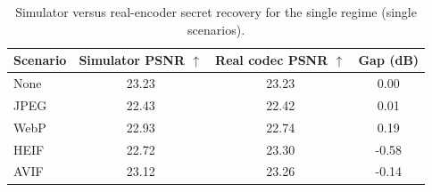 \begin{table}[t]
\centering
\caption{Simulator versus real-encoder secret recovery for the single regime (single scenarios).}
\label{tab:single-single-gap}
\begin{tabular}{lccc}
\toprule
Scenario & Simulator PSNR $\uparrow$ & Real codec PSNR $\uparrow$ & Gap (dB) \\
\midrule
None & 23.23 & 23.23 & 0.00 \\
JPEG & 22.43 & 22.42 & 0.01 \\
WebP & 22.93 & 22.74 & 0.19 \\
HEIF & 22.72 & 23.30 & -0.58 \\
AVIF & 23.12 & 23.26 & -0.14 \\
\bottomrule
\end{tabular}
\end{table}
